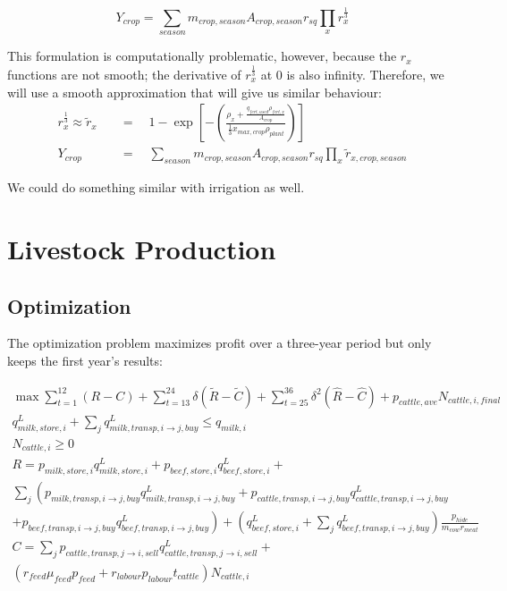\documentclass[letter,12pt]{article}
\begin{document}
\begin{equation}
Y_{crop} = \sum_{season} m_{crop,season} A_{crop,season} r_{sq} \prod_x r_x^{\frac{1}{3}}
\end{equation}

This formulation is computationally problematic, however, because the $r_x$ functions are not smooth; the derivative of $r_x^{\frac{1}{3}}$ at 0 is also infinity.  Therefore, we will use a smooth approximation that will give us similar behaviour:
\begin{align}
r_x^{\frac{1}{3}} \approx \tilde{r}_x  \quad &= \quad  1 - \exp \left[ -\left(\frac{\rho_x + \frac{q_{fert,used} \rho_{fert,x}}{A_{crop}}}{\frac{1}{3} x_{max,crop}\rho_{plant}} \right) \right] \\
Y_{crop}  \quad &= \quad  \sum_{season} m_{crop,season} A_{crop,season} r_{sq} \prod_x \tilde{r}_{x,crop,season}
\end{align}

We could do something similar with irrigation as well.

\section{Livestock Production}

\subsection{Optimization}

The optimization problem maximizes profit over a three-year period but only keeps the first year's results:

\begin{gather}
\max \sum_{t=1}^{12} \left(R - C\right) + \sum_{t=13}^{24} \delta \left(\tilde{R} - \tilde{C}\right) + \sum_{t=25}^{36} \delta^2 \left(\hat{R} - \hat{C}\right) + p_{cattle,ave} N_{cattle,i,final}\\
q_{milk,store,i}^L + \sum_j q_{milk,transp,i \rightarrow j,buy}^L \leq q_{milk,i} \label{milk sold con}\\
N_{cattle,i} \geq 0 \label{herd size con}\\
R = p_{milk,store,i} q_{milk,store,i}^L + p_{beef,store,i} q_{beef,store,i}^L + \nonumber \\
\sum_j \left( p_{milk,transp,i \rightarrow j,buy} q_{milk,transp,i \rightarrow j,buy}^L + p_{cattle,transp,i \rightarrow j,buy} q_{cattle,transp,i \rightarrow j,buy}^L \right. \\
\left. + p_{beef,transp,i \rightarrow j,buy} q_{beef,transp,i \rightarrow j,buy}^L \right) + \left(q_{beef,store,i}^L + \sum_j q_{beef,transp,i \rightarrow j,buy}^L \right) \frac{p_{hide}}{m_{cow} r_{meat}} \\
C = \sum_j p_{cattle,transp,j \rightarrow i,sell} q_{cattle,transp,j \rightarrow i,sell}^L + \nonumber \\
\left(r_{feed} \mu_{feed} p_{feed} + r_{labour} p_{labour} t_{cattle} \right) N_{cattle,i}
\end{gather}
\end{document}

